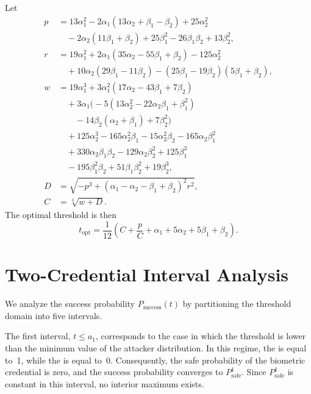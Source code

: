 \documentclass[conference,compsoc]{IEEEtran}
\begin{document}
Let
\begin{align*}
p &= 13\alpha_1^2 - 2\alpha_1(13\alpha_2 + \beta_1 - \beta_2) + 25\alpha_2^2 \\
  &\quad - 2\alpha_2(11\beta_1 + \beta_2) + 25\beta_1^2 - 26\beta_1\beta_2 + 13\beta_2^2, \\[4pt]
r &= 19\alpha_1^2 + 2\alpha_1(35\alpha_2 - 55\beta_1 + \beta_2) - 125\alpha_2^2 \\
  &\quad + 10\alpha_2(29\beta_1 - 11\beta_2) - (25\beta_1 - 19\beta_2)(5\beta_1 + \beta_2), \\[4pt]
w &= 19\alpha_1^3 + 3\alpha_1^2(17\alpha_2 - 43\beta_1 + 7\beta_2) \\
  &\quad + 3\alpha_1\bigl(-5(13\alpha_2^2 - 22\alpha_2\beta_1 + \beta_1^2) \\
  &\quad\quad - 14\beta_2(\alpha_2 + \beta_1) + 7\beta_2^2\bigr) \\
  &\quad + 125\alpha_2^3 - 165\alpha_2^2\beta_1 - 15\alpha_2^2\beta_2 - 165\alpha_2\beta_1^2 \\
  &\quad + 330\alpha_2\beta_1\beta_2 - 129\alpha_2\beta_2^2 + 125\beta_1^3 \\
  &\quad - 195\beta_1^2\beta_2 + 51\beta_1\beta_2^2 + 19\beta_2^3, \\[4pt]
D &= \sqrt{-p^3 + (\alpha_1 - \alpha_2 - \beta_1 + \beta_2)^2 r^2}, \\[4pt]
C &= \sqrt[3]{w + D}.
\end{align*}
The optimal threshold is then
\begin{equation*}
t_{\text{opt}} = \frac{1}{12}\left(C + \frac{p}{C} + \alpha_1 + 5\alpha_2 + 5\beta_1 + \beta_2\right).
\end{equation*}

\section{Two-Credential Interval Analysis}\label{app:two_cred_intervals}
\noindent
We analyze the success probability $P_{\text{success}}(t)$ by partitioning the threshold domain into five intervals.

The first interval, $t \le a_1$, corresponds to the case in which the threshold is lower than the minimum value of the attacker distribution. In this regime, the \FAR is equal to~1, while the \FRR is equal to~0. Consequently, the safe probability of the biometric credential is zero, and the success probability converges to $P^{1}_{\text{safe}}$. Since $P^{1}_{\text{safe}}$ is constant in this interval, no interior maximum exists.
\end{document}

